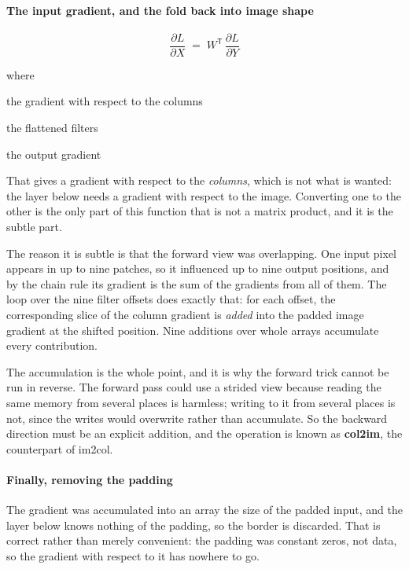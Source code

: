 \paragraph{The input gradient, and the fold back into image shape}

\begin{equation}
\frac{\partial L}{\partial X} \;=\; W^{\mathsf{T}} \, \frac{\partial L}{\partial Y}
\end{equation}

\noindent where
\begin{description}[leftmargin=2.4em,style=nextline,font=\normalfont\ttfamily]\setlength\itemsep{1pt}
  \item[{$\frac{\partial L}{\partial X}$}] \normalfont the gradient with respect to the columns
  \item[{$W$}] \normalfont the flattened filters
  \item[{$\frac{\partial L}{\partial Y}$}] \normalfont the output gradient
\end{description}
That gives a gradient with respect to the \emph{columns}, which is not what is wanted: the layer below needs a gradient with respect to the image. Converting one to the other is the only part of this function that is not a matrix product, and it is the subtle part.

The reason it is subtle is that the forward view was overlapping. One input pixel appears in up to nine patches, so it influenced up to nine output positions, and by the chain rule its gradient is the sum of the gradients from all of them. The loop over the nine filter offsets does exactly that: for each offset, the corresponding slice of the column gradient is \emph{added} into the padded image gradient at the shifted position. Nine additions over whole arrays accumulate every contribution.

The accumulation is the whole point, and it is why the forward trick cannot be run in reverse. The forward pass could use a strided view because reading the same memory from several places is harmless; writing to it from several places is not, since the writes would overwrite rather than accumulate. So the backward direction must be an explicit addition, and the operation is known as \textbf{col2im}, the counterpart of im2col.


\paragraph{Finally, removing the padding}
The gradient was accumulated into an array the size of the padded input, and the layer below knows nothing of the padding, so the border is discarded. That is correct rather than merely convenient: the padding was constant zeros, not data, so the gradient with respect to it has nowhere to go.


